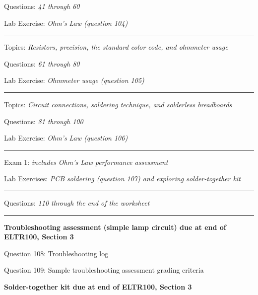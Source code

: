 \hskip 10pt Questions: {\it 41 through 60}
 
\hskip 10pt Lab Exercise: {\it Ohm's Law (question 104)}
 
\vskip 10pt
\hrule \vskip 5pt
\noindent
{}

\hskip 10pt Topics: {\it Resistors, precision, the standard color code, and ohmmeter usage}
 
\hskip 10pt Questions: {\it 61 through 80}
 
\hskip 10pt Lab Exercise: {\it Ohmmeter usage (question 105)}
 

\vskip 10pt
\hrule \vskip 5pt
\noindent
{}

\hskip 10pt Topics: {\it Circuit connections, soldering technique, and solderless breadboards}
 
\hskip 10pt Questions: {\it 81 through 100}
 
\hskip 10pt Lab Exercise: {\it Ohm's Law (question 106)}
 


\vskip 10pt
\hrule \vskip 5pt
\noindent
{}

\hskip 10pt Exam 1: {\it includes Ohm's Law performance assessment}
 
\hskip 10pt Lab Exercises: {\it PCB soldering (question 107) and exploring solder-together kit}
 
\vskip 10pt
\hrule \vskip 5pt
\noindent
{}

\hskip 10pt Questions: {\it 110 through the end of the worksheet}
 
\vskip 10pt
\hrule \vskip 5pt
\noindent
{}

\hskip 10pt {\bf Troubleshooting assessment (simple lamp circuit) due at end of ELTR100, Section 3}
 
\hskip 10pt Question 108: Troubleshooting log
 
\hskip 10pt Question 109: Sample troubleshooting assessment grading criteria
 
\hskip 10pt {\bf Solder-together kit due at end of ELTR100, Section 3}

